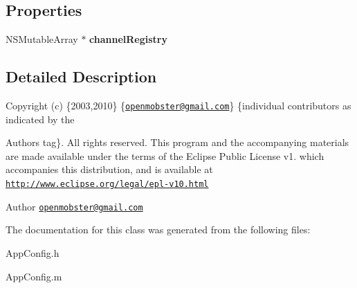 \subsection*{\-Properties}
\begin{DoxyCompactItemize}
\item 
\hypertarget{interface_app_config_a4c4c348fbeaa9b1c969c9e54664718f2}{
\-N\-S\-Mutable\-Array $\ast$ {\bfseries channel\-Registry}}
\label{interface_app_config_a4c4c348fbeaa9b1c969c9e54664718f2}

\end{DoxyCompactItemize}


\subsection{\-Detailed \-Description}
\-Copyright (c) \{2003,2010\} \{\href{mailto:openmobster@gmail.com}{\tt openmobster@gmail.\-com}\} \{individual contributors as indicated by the \begin{DoxyAuthor}{\-Authors}
tag\}. \-All rights reserved. \-This program and the accompanying materials are made available under the terms of the \-Eclipse \-Public \-License v1. which accompanies this distribution, and is available at \href{http://www.eclipse.org/legal/epl-v10.html}{\tt http\-://www.\-eclipse.\-org/legal/epl-\/v10.\-html}
\end{DoxyAuthor}
\begin{DoxyAuthor}{\-Author}
\href{mailto:openmobster@gmail.com}{\tt openmobster@gmail.\-com} 
\end{DoxyAuthor}


\-The documentation for this class was generated from the following files\-:\begin{DoxyCompactItemize}
\item 
\-App\-Config.\-h\item 
\-App\-Config.\-m\end{DoxyCompactItemize}
